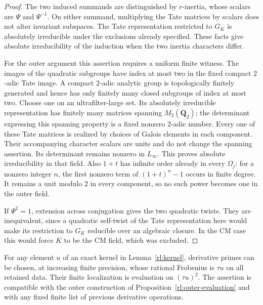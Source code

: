 \begin{proof}
The two induced summands are distinguished by $r$-inertia, whose
scalars are $\Psi$ and $\Psi^{-1}$.  On either summand, multiplying
the Tate matrices by scalars does not alter invariant subspaces.
The Tate representation restricted to $G_K$ is absolutely
irreducible under the exclusions already specified.  These facts
give absolute irreducibility of the induction when the two inertia
characters differ.

For the outer argument this assertion requires a uniform finite
witness.  The images of the quadratic subgroups have index at most
two in the fixed compact $2$-adic Tate image.  A compact $2$-adic
analytic group is topologically finitely generated and hence has
only finitely many closed subgroups of index at most two.  Choose
one on an ultrafilter-large set.  Its absolutely irreducible
representation has finitely many matrices spanning
$M_2(\mathbf Q_2)$; the determinant expressing this spanning
property is a fixed nonzero $2$-adic number.  Every one of these
Tate matrices is realized by choices of Galois elements in each
component.  Their accompanying character scalars are units and
do not change the spanning assertion.  Its determinant remains
nonzero in $L_\infty$.  This proves absolute irreducibility in
that field.  Also $1+t$ has infinite order already in every
$\Omega_j$: for a nonzero integer $n$, the first nonzero term of
$(1+t)^n-1$ occurs in finite degree.  It remains a unit modulo
$2$ in every component, so no such power becomes one in the
outer field.

If $\Psi^2=1$, extension across conjugation gives the two quadratic
twists.  They are inequivalent, since a quadratic self-twist of the
Tate representation here would make its restriction to $G_K$
reducible over an algebraic closure.  In the CM case this would
force $K$ to be the CM field, which was excluded.
\end{proof}

\begin{lemma}
\label{rl:chebotarev-evaluation}
For any element $u$ of an exact kernel in Lemma~\ref{rl:kernel},
derivative primes can be chosen, at increasing finite precision,
whose rational Frobenius is $\tau u$ on all retained data.  Their
finite localization is evaluation on $(\tau u)^2$.  The assertion
is compatible with the outer construction of
Proposition~\ref{rl:outer-evaluation} and with any fixed finite
list of previous derivative operations.
\end{lemma}

